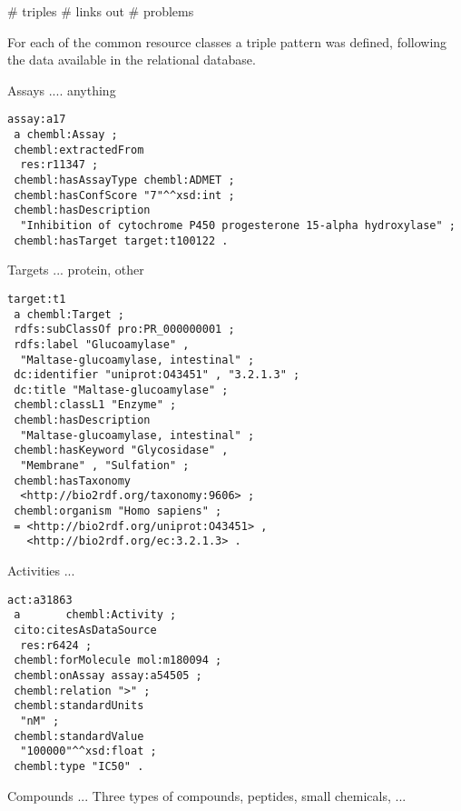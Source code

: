 \documentclass[sw]{iosart2c}
\begin{document}
\# triples
\# links out
\# problems

For each of the common resource classes a triple pattern was defined, following the
data available in the relational database.

Assays .... anything

\begin{small}
\begin{verbatim}
assay:a17
 a chembl:Assay ;
 chembl:extractedFrom
  res:r11347 ;
 chembl:hasAssayType chembl:ADMET ;
 chembl:hasConfScore "7"^^xsd:int ;
 chembl:hasDescription
  "Inhibition of cytochrome P450 progesterone 15-alpha hydroxylase" ;
 chembl:hasTarget target:t100122 .
\end{verbatim}
\end{small}

Targets ... protein, other

\begin{small}
\begin{verbatim}
target:t1
 a chembl:Target ;
 rdfs:subClassOf pro:PR_000000001 ;
 rdfs:label "Glucoamylase" , 
  "Maltase-glucoamylase, intestinal" ;
 dc:identifier "uniprot:O43451" , "3.2.1.3" ;
 dc:title "Maltase-glucoamylase" ;
 chembl:classL1 "Enzyme" ;
 chembl:hasDescription
  "Maltase-glucoamylase, intestinal" ;
 chembl:hasKeyword "Glycosidase" , 
  "Membrane" , "Sulfation" ;
 chembl:hasTaxonomy
  <http://bio2rdf.org/taxonomy:9606> ;
 chembl:organism "Homo sapiens" ;
 = <http://bio2rdf.org/uniprot:O43451> , 
   <http://bio2rdf.org/ec:3.2.1.3> .
\end{verbatim}
\end{small}

Activities ...

\begin{small}
\begin{verbatim}
act:a31863
 a       chembl:Activity ;
 cito:citesAsDataSource
  res:r6424 ;
 chembl:forMolecule mol:m180094 ;
 chembl:onAssay assay:a54505 ;
 chembl:relation ">" ;
 chembl:standardUnits
  "nM" ;
 chembl:standardValue
  "100000"^^xsd:float ;
 chembl:type "IC50" .
\end{verbatim}
\end{small}

Compounds ... Three types of compounds, peptides, small chemicals, ...
\end{document}
